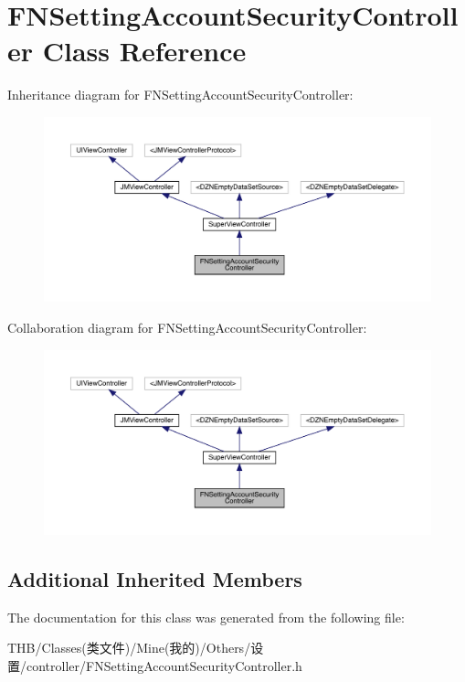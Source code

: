 \hypertarget{interface_f_n_setting_account_security_controller}{}\section{F\+N\+Setting\+Account\+Security\+Controller Class Reference}
\label{interface_f_n_setting_account_security_controller}


Inheritance diagram for F\+N\+Setting\+Account\+Security\+Controller\+:\nopagebreak
\begin{figure}[H]
\begin{center}
\leavevmode
\includegraphics[width=350pt]{interface_f_n_setting_account_security_controller__inherit__graph}
\end{center}
\end{figure}


Collaboration diagram for F\+N\+Setting\+Account\+Security\+Controller\+:\nopagebreak
\begin{figure}[H]
\begin{center}
\leavevmode
\includegraphics[width=350pt]{interface_f_n_setting_account_security_controller__coll__graph}
\end{center}
\end{figure}
\subsection*{Additional Inherited Members}


The documentation for this class was generated from the following file\+:\begin{DoxyCompactItemize}
\item 
T\+H\+B/\+Classes(类文件)/\+Mine(我的)/\+Others/设置/controller/F\+N\+Setting\+Account\+Security\+Controller.\+h\end{DoxyCompactItemize}
